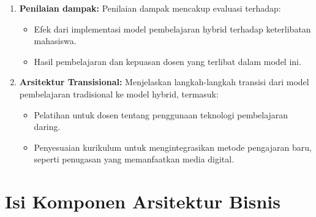 \begin{enumerate}
	\item \textbf{Penilaian dampak:}  
	Penilaian dampak mencakup evaluasi terhadap:
	\begin{itemize}
		\item Efek dari implementasi model pembelajaran hybrid terhadap keterlibatan mahasiswa.
		\item Hasil pembelajaran dan kepuasan dosen yang terlibat dalam model ini.
	\end{itemize}
	
	\item \textbf{Arsitektur Transisional:}  
	Menjelaskan langkah-langkah transisi dari model pembelajaran tradisional ke model hybrid, termasuk:
	\begin{itemize}
		\item Pelatihan untuk dosen tentang penggunaan teknologi pembelajaran daring.
		\item Penyesuaian kurikulum untuk mengintegrasikan metode pengajaran baru, seperti penugasan yang memanfaatkan media digital.
	\end{itemize}
\end{enumerate}


\section{Isi Komponen Arsitektur Bisnis}
\label{sec:isi_komponen_arsitektur_bisnis}

